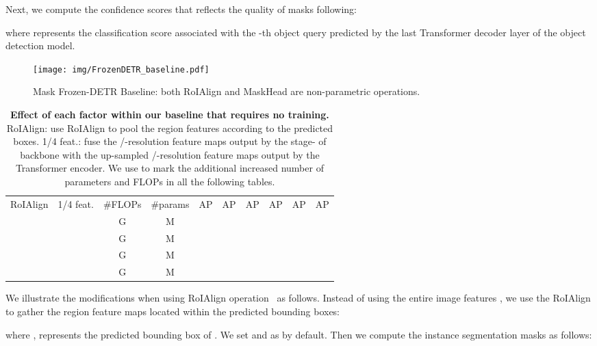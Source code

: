 \documentclass[10pt,twocolumn,letterpaper]{article}
\newcommand{\cmark}{\ding{51}}\newcommand{\xmark}{\ding{55}}
\begin{document}
Next, we compute the confidence scores that reflects the quality of masks following:

where  represents the classification score associated with the -th object query predicted by the last Transformer decoder layer of the object detection model.

\begin{figure}[t]
\centering
\texttt{[image: img/FrozenDETR\_baseline.pdf]}
\caption{\small{Mask Frozen-DETR Baseline: both RoIAlign and MaskHead are non-parametric operations.}}
\label{fig:frozen_detr_pipeline_0}
\end{figure}


\begin{table}[t]
\begin{minipage}[t]{1\linewidth}
\vspace{2mm}
\centering
\setlength{\tabcolsep}{1pt}
\footnotesize
\renewcommand{\arraystretch}{1.2}
\resizebox{1.0\linewidth}{!}
{
\begin{tabular}{c|c|c|c|cccccc}
RoIAlign & 1/4 feat.  & \#FLOPs & \#params & AP & AP & AP & AP & AP & AP \\
\shline
\xmark & \xmark  &  G &  M &  &  &  &  &   &  \\
\cmark & \xmark  &  G &  M &  &  &  &  &  &  \\
\xmark & \cmark  &  G &  M &  &  &  &  &  &  \\
\rowcolor{gray!10}\cmark & \cmark  &  G &  M &  &  &  &  &   &  \\
\end{tabular}
}
\caption{\small{\textbf{
Effect of each factor within our baseline that requires no training.}}
RoIAlign: use RoIAlign to pool the region features according to the predicted boxes.
1/4 feat.: fuse the /-resolution feature maps output by the stage- of backbone with the up-sampled /-resolution feature maps output by the Transformer encoder.
We use  to mark the additional increased number of parameters and FLOPs in all the following tables.
}
\label{tab:baseline_ablate}
\end{minipage}
\end{table}


We illustrate the modifications when using RoIAlign operation~\cite{he2017mask} as follows. Instead of using the entire image features , we use the RoIAlign to gather the region feature maps located within the predicted bounding boxes:

where ,  represents the predicted bounding box of .
We set  and  as  by default.
Then we compute the instance segmentation masks as follows:
\end{document}

